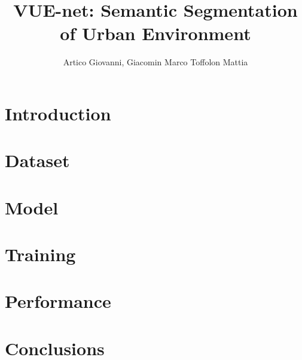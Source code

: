 \documentclass[letterpaper]{article} %
\title{{\huge VUE-net: Semantic Segmentation of Urban Environment}}
\author{
    Artico Giovanni\equalcontrib,
    Giacomin Marco\equalcontrib
    Toffolon Mattia\equalcontrib
}
\begin{document}
\maketitle

% 
% 
% 

\section{Introduction}


\section{Dataset}


\section{Model}


\section{Training}


\section{Performance}


\section{Conclusions}


\nocite{*}
\newpage

\end{document}
